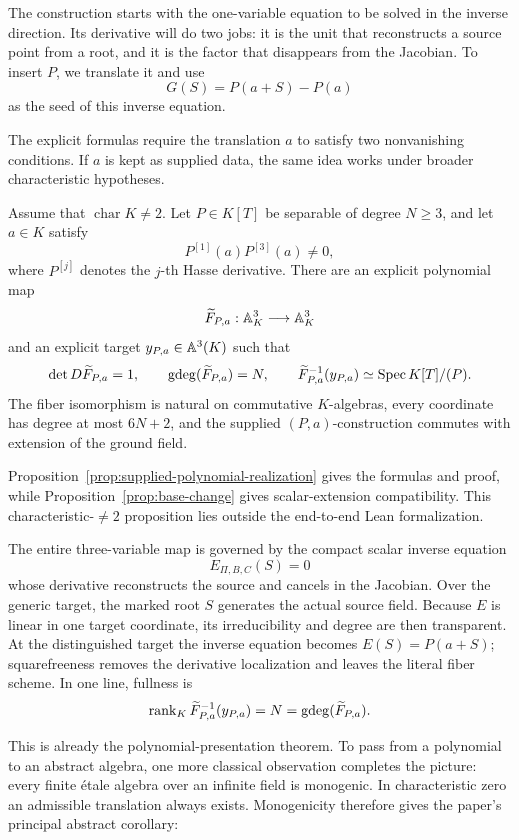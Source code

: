 The construction starts with the one-variable equation to be solved in the
inverse direction.  Its derivative will do two jobs: it is the
unit that reconstructs a source point from a root, and it is the factor that
disappears from the Jacobian.  To insert \(P\), we translate it and use
\[
 G(S)=P(a+S)-P(a)
\]
as the seed of this inverse equation.

The explicit formulas require the translation \(a\) to satisfy two
nonvanishing conditions.  If \(a\) is kept as supplied data, the same idea
works under broader characteristic hypotheses.

\begin{proposition}\label{prop:supplied-intro}
Assume that \(\operatorname{char}K\neq2\).  Let \(P\in K[T]\) be separable
of degree \(N\geq3\), and let \(a\in K\) satisfy
\[
 P^{[1]}(a)P^{[3]}(a)\neq0,
\]
where \(P^{[j]}\) denotes the \(j\)-th Hasse derivative.  There are an
explicit polynomial map
\[
 \widetilde F_{P,a}:\mathbb A^3_K\longrightarrow\mathbb A^3_K
\]
and an explicit target \(y_{P,a}\in\mathbb A^3(K)\) such that
\[
 \det D\widetilde F_{P,a}=1,\qquad
 \operatorname{gdeg}(\widetilde F_{P,a})=N,\qquad
 \widetilde F_{P,a}^{-1}(y_{P,a})
 \simeq\operatorname{Spec} K[T]/(P).
\]
The fiber isomorphism is natural on commutative \(K\)-algebras, every
coordinate has degree at most \(6N+2\), and the supplied
\((P,a)\)-construction commutes with extension of the ground field.
\end{proposition}

Proposition~\ref{prop:supplied-polynomial-realization} gives the formulas and
proof, while Proposition~\ref{prop:base-change} gives scalar-extension
compatibility.  This characteristic-\(\ne2\) proposition lies outside the
end-to-end Lean formalization.

The entire three-variable map is governed by
the compact scalar inverse equation
\[
 E_{\Pi,B,C}(S)=0
\]
whose derivative reconstructs the source and cancels in the Jacobian.  Over
the generic target, the marked root \(S\) generates the actual source field.
Because \(E\) is linear in one target coordinate, its irreducibility and
degree are then transparent.  At the distinguished target the inverse
equation becomes \(E(S)=P(a+S)\); squarefreeness removes the derivative
localization and leaves the literal fiber scheme.  In one line, fullness is
\[
 \operatorname{rank}_K\widetilde F_{P,a}^{-1}(y_{P,a})
 =N=\operatorname{gdeg}(\widetilde F_{P,a}).
\]

This is already the polynomial-presentation theorem.  To pass from a
polynomial to an abstract algebra, one more classical observation completes
the picture: every finite \'etale algebra over an infinite field is
monogenic.  In characteristic zero an admissible translation always exists.
Monogenicity therefore gives the paper's principal abstract corollary:

